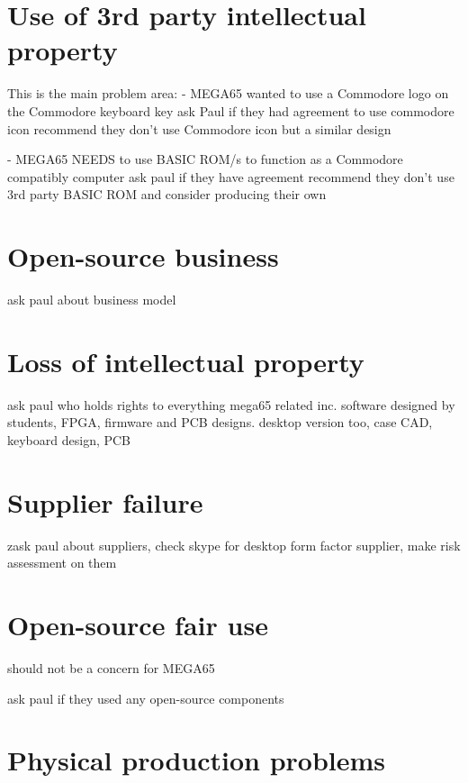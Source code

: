 \section{Use of 3rd party intellectual property}
This is the main problem area:
- MEGA65 wanted to use a Commodore logo on the Commodore keyboard key
ask Paul if they had agreement to use commodore icon
recommend they don't use Commodore icon but a similar design

- MEGA65 NEEDS to use BASIC ROM/s to function as a Commodore compatibly computer
ask paul if they have agreement
recommend they don't use 3rd party BASIC ROM and consider producing their own


\section{Open-source business}
ask paul about business model

\section{Loss of intellectual property}
ask paul who holds rights to everything mega65 related inc. software designed by students, FPGA, firmware and PCB designs. desktop version too, case CAD, keyboard design, PCB

\section{Supplier failure}
zask paul about suppliers, check skype for desktop form factor supplier, make risk assessment on them

\section{Open-source fair use}
should not be a concern for MEGA65

ask paul if they used any open-source components

\section{Physical production problems}
